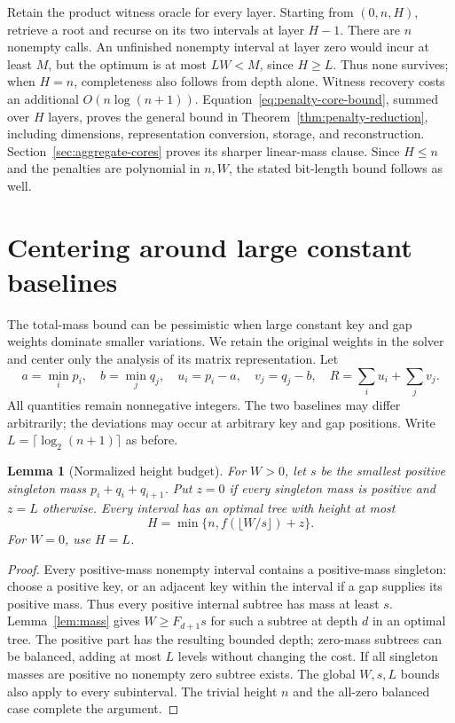 \documentclass[11pt]{article}
\newtheorem{lemma}[theorem]{Lemma}
\begin{document}
Retain the product witness oracle for every layer. Starting from $(0,n,H)$,
retrieve a root and recurse on its two intervals at layer $H-1$.
There are $n$ nonempty calls. An unfinished nonempty interval at layer zero
would incur at least $M$, but the optimum is at most $LW<M$, since
$H\ge L$. Thus none survives; when $H=n$, completeness also follows from
depth alone. Witness recovery costs an additional $O(n\log(n+1))$.
Equation~\eqref{eq:penalty-core-bound}, summed over $H$ layers, proves
the general bound in Theorem~\ref{thm:penalty-reduction}, including
dimensions, representation conversion, storage, and reconstruction.
Section~\ref{sec:aggregate-cores} proves its sharper linear-mass clause. Since $H\le n$ and the penalties
are polynomial in $n,W$, the stated bit-length bound follows as well.


\section{Centering around large constant baselines}
\label{sec:centering}

The total-mass bound can be pessimistic when large constant key and gap
weights dominate smaller variations. We retain the original weights in the
solver and center only the analysis of its matrix representation. Let
\[
 a=\min_i p_i,\quad b=\min_j q_j,\quad
 u_i=p_i-a,\quad v_j=q_j-b,\quad R=\sum_i u_i+\sum_j v_j.
\]
All quantities remain nonnegative integers. The two baselines may differ
arbitrarily; the deviations may occur at arbitrary key and gap positions.
Write $L=\lceil\log_2(n+1)\rceil$ as before.

\begin{lemma}[Normalized height budget]\label{lem:normalized-height}
For $W>0$, let $s$ be the smallest positive singleton mass
$p_i+q_i+q_{i+1}$. Put $z=0$ if every singleton mass is positive and $z=L$
otherwise. Every interval has an optimal tree with height at most
\[
 H=\min\{n,f(\lfloor W/s\rfloor)+z\}.
\]
For $W=0$, use $H=L$.
\end{lemma}
\begin{proof}
Every positive-mass nonempty interval contains a positive-mass singleton:
choose a positive key, or an adjacent key within the interval if a gap
supplies its positive mass. Thus every positive internal subtree has mass
at least $s$. Lemma~\ref{lem:mass} gives $W\ge F_{d+1}s$ for such a subtree at depth $d$
in an optimal tree. The positive part has the resulting bounded depth;
zero-mass subtrees can be balanced, adding at most $L$ levels without
changing the cost. If all singleton masses are positive no nonempty zero
subtree exists. The global $W,s,L$ bounds also apply to every subinterval.
The trivial height $n$ and the all-zero balanced case complete the argument.
\end{proof}
\end{document}
